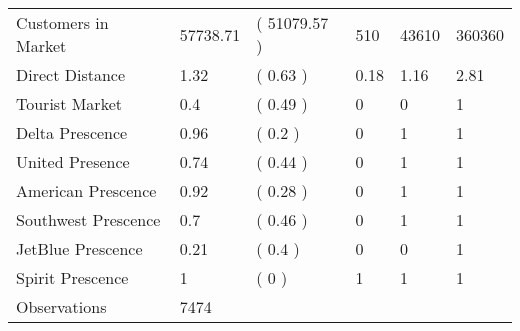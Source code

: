 \begin{tabular}[t]{llllll}
\hspace{1em}Customers in Market & 57738.71 & ( 51079.57 ) & 510 & 43610 & 360360\\
\hspace{1em}Direct Distance & 1.32 & ( 0.63 ) & 0.18 & 1.16 & 2.81\\
\hspace{1em}Tourist Market & 0.4 & ( 0.49 ) & 0 & 0 & 1\\
\hspace{1em}Delta Prescence & 0.96 & ( 0.2 ) & 0 & 1 & 1\\
\hspace{1em}United Presence & 0.74 & ( 0.44 ) & 0 & 1 & 1\\
\hspace{1em}American Prescence & 0.92 & ( 0.28 ) & 0 & 1 & 1\\
\hspace{1em}Southwest Prescence & 0.7 & ( 0.46 ) & 0 & 1 & 1\\
\hspace{1em}JetBlue Prescence & 0.21 & ( 0.4 ) & 0 & 0 & 1\\
\hspace{1em}Spirit Prescence & 1 & ( 0 ) & 1 & 1 & 1\\
\midrule
\hspace{1em}Observations & 7474 &  &  &  & \\
\bottomrule
\end{tabular}
